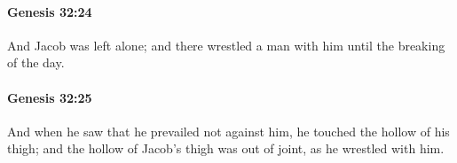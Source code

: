		\paragraph{Genesis 32:24} %
			\label{GENESIS-32-24}

			And Jacob was left alone; and there wrestled a man with him until the breaking of the day.


		\paragraph{Genesis 32:25} %
			\label{GENESIS-32-25}

			And when he saw that he prevailed not against him, he touched the hollow of his thigh; and the hollow of Jacob's thigh was out of joint, as he wrestled with him.


